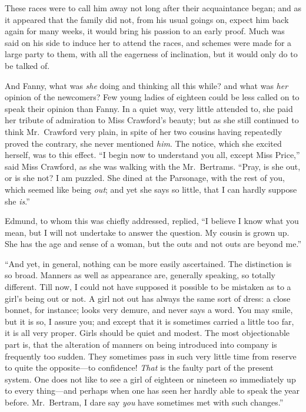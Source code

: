 These races were to call him away not long after their
acquaintance began; and as it appeared that the family
did not, from his usual goings on, expect him back
again for many weeks, it would bring his passion to an
early proof.  Much was said on his side to induce her
to attend the races, and schemes were made for a large
party to them, with all the eagerness of inclination,
but it would only do to be talked of.

And Fanny, what was \emph{she} doing and thinking all this
while? and what was \emph{her} opinion of the newcomers?
Few young ladies of eighteen could be less called on
to speak their opinion than Fanny.  In a quiet way,
very little attended to, she paid her tribute of admiration
to Miss Crawford's beauty; but as she still continued
to think Mr.\ Crawford very plain, in spite of her two
cousins having repeatedly proved the contrary, she never
mentioned \emph{him}.  The notice, which she excited herself,
was to this effect.  ``I begin now to understand you all,
except Miss Price,'' said Miss Crawford, as she was
walking with the Mr.\ Bertrams.  ``Pray, is she out,
or is she not?  I am puzzled.  She dined at the Parsonage,
with the rest of you, which seemed like being \emph{out};
and yet she says so little, that I can hardly suppose
she \emph{is}.''

Edmund, to whom this was chiefly addressed, replied, ``I believe
I know what you mean, but I will not undertake to answer
the question.  My cousin is grown up.  She has the age
and sense of a woman, but the outs and not outs are beyond me.''

``And yet, in general, nothing can be more easily ascertained.
The distinction is so broad.  Manners as well as
appearance are, generally speaking, so totally different.
Till now, I could not have supposed it possible to be
mistaken as to a girl's being out or not.  A girl not
out has always the same sort of dress:  a close bonnet,
for instance; looks very demure, and never says a word.
You may smile, but it is so, I assure you; and except
that it is sometimes carried a little too far, it is
all very proper.  Girls should be quiet and modest.
The most objectionable part is, that the alteration
of manners on being introduced into company is frequently
too sudden.  They sometimes pass in such very little
time from reserve to quite the opposite---to confidence!
\emph{That} is the faulty part of the present system.
One does not like to see a girl of eighteen or nineteen
so immediately up to every thing---and perhaps when one
has seen her hardly able to speak the year before.
Mr.\ Bertram, I dare say \emph{you} have sometimes met with
such changes.''

